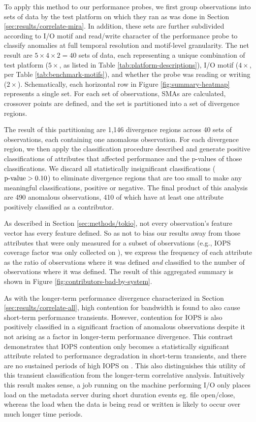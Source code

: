 To apply this method to our performance probes, we first group observations into sets of data by the test platform on which they ran as was done in Section \ref{sec:results/correlate-mira}.
In addition, these sets are further subdivided according to I/O motif and read/write character of the performance probe to classify anomalies at full temporal resolution and motif-level granularity.
The net result are $5 \times 4 \times 2 = 40$ sets of data, each representing a unique combination of test platform ($5 \times$, as listed in Table \ref{tab:platform-descriptions}), I/O motif ($4 \times$, per Table \ref{tab:benchmark-motifs}), and whether the probe was reading or writing ($2 \times$).
Schematically, each horizontal row in Figure \ref{fig:summary-heatmap} represents a single set.
For each set of observations, SMAs are calculated, crossover points are defined, and the set is partitioned into a set of divergence regions.

The result of this partitioning are 1,146 divergence regions across 40 sets of observations, each containing one anomalous observation.
For each divergence region, we then apply the classification procedure described and generate positive classifications of attributes that affected performance and the p-values of those classifications.
We discard all statistically insignificant classifications ($\textup{p-value} > 0.10$) to eliminate divergence regions that are too small to make any meaningful classifications, positive or negative.
The final product of this analysis are 490 anomalous observations, 410 of which have at least one attribute positively classified as a contributor.

As described in Section \ref{sec:methods/tokio}, not every observation's feature vector has every feature defined.
So as not to bias our results away from those attributes that were only measured for a subset of observations (e.g., IOPS coverage factor was only collected on \mira), we express the frequency of each attribute as the ratio of observations where it was defined \emph{and} classified to the number of observations where it was defined.
The result of this aggregated summary is shown in Figure \ref{fig:contributors-bad-by-system}.

As with the longer-term performance divergence characterized in Section \ref{sec:results/correlate-all}, high contention for bandwidth is found to also cause short-term performance transients.
However, contention for IOPS is also positively classified in a significant fraction of anomalous observations despite it not arising as a factor in longer-term performance divergence.
This contrast demonstrates that IOPS contention only becomes a statistically significant attribute related to performance degradation in short-term transients, and there are no sustained periods of high IOPS on \mirafsone.
This also distinguishes this utility of this transient classification from
the longer-term correlative analysis. Intuitively this result makes sense, a job running on the machine performing I/O only places load on the metadata server during short duration events  eg. file open/close, whereas the load when the data is being read or written is likely to occur over much longer time periods. 

